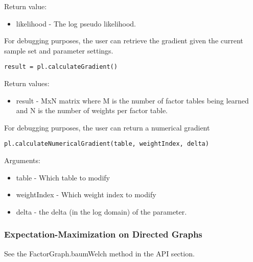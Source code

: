 Return value:
\begin{itemize}
\item likelihood - The log pseudo likelihood.
\end{itemize}

For debugging purposes, the user can retrieve the gradient given the current sample set and parameter settings.

\begin{lstlisting}
result = pl.calculateGradient()
\end{lstlisting}

Return values:
\begin{itemize}
\item result - MxN matrix where M is the number of factor tables being learned and N is the number of weights per factor table.
\end{itemize}

For debugging purposes, the user can return a numerical gradient

\begin{lstlisting}
pl.calculateNumericalGradient(table, weightIndex, delta)
\end{lstlisting}

Arguments:
\begin{itemize}
\item table - Which table to modify
\item weightIndex - Which weight index to modify
\item delta - the delta (in the log domain) of the parameter.
\end{itemize}



\subsubsection{Expectation-Maximization on Directed Graphs}

See the FactorGraph.baumWelch method in the API section.

%
%
%
